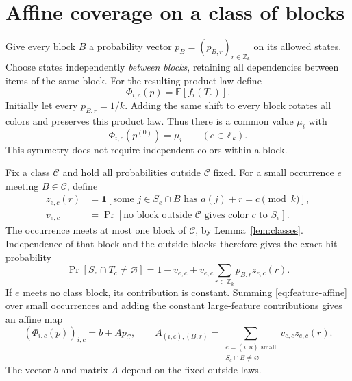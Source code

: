 \documentclass[acmsmall,11pt,nonacm]{acmart}
\newcommand{\ind}{\mathbf{1}}
\newcommand{\Zk}{\mathbb{Z}_k}
\newcommand{\calC}{\mathcal{C}}
\newcommand{\Phiic}{\Phi_{i,c}}
\begin{document}
\section{Affine coverage on a class of blocks}
\label{sec:affine}

Give every block $B$ a probability vector
$p_B=(p_{B,r})_{r\in\Zk}$ on its allowed states. Choose states
independently \emph{between blocks}, retaining all dependencies between
items of the same block. For the resulting product law define
\[
 \Phiic(p)=\mathbb{E}[f_i(T_c)].
\]
Initially let every $p_{B,r}=1/k$. Adding the same shift to every block
rotates all colors and preserves this product law. Thus there is a common
value $\mu_i$ with
\begin{equation}
 \Phiic(p^{(0)})=\mu_i \qquad(c\in\Zk).
 \label{eq:symmetry}
\end{equation}
This symmetry does not require independent colors within a block.

Fix a class $\calC$ and hold all probabilities outside $\calC$ fixed.
For a small occurrence $e$ meeting $B\in\calC$, define
\begin{align*}
 z_{e,c}(r)&=\ind[\text{some }j\in S_e\cap B
                         \text{ has }a(j)+r=c\pmod k],\\
 v_{e,c}&=\Pr[\text{no block outside }\calC
                         \text{ gives color }c\text{ to }S_e].
\end{align*}
The occurrence meets at most one block of $\calC$, by
Lemma~\ref{lem:classes}. Independence of that block and the outside
blocks therefore gives the exact hit probability
\begin{equation}
 \Pr[S_e\cap T_c\ne\varnothing]
    =1-v_{e,c}+v_{e,c}\sum_{r\in\Zk}p_{B,r}z_{e,c}(r).
 \label{eq:feature-affine}
\end{equation}
If $e$ meets no class block, its contribution is constant. Summing
\eqref{eq:feature-affine} over small occurrences and adding the constant
large-feature contributions gives an affine map
\begin{equation}
 (\Phiic(p))_{i,c}=b+A p_{\calC},\qquad
 A_{(i,c),(B,r)}=
 \sum_{\substack{e=(i,u)\text{ small}\\S_e\cap B\ne\varnothing}}
                    v_{e,c}z_{e,c}(r).
 \label{eq:matrix}
\end{equation}
The vector $b$ and matrix $A$ depend on the fixed outside laws.
\end{document}
